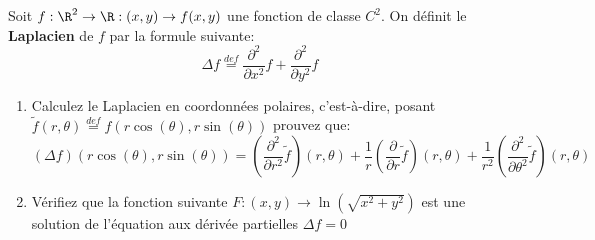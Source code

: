 
\begin{exercice}\label{exo0061}

Soit $f:\R^2 \rightarrow \R: (x, y) \rightarrow f(x,y)$ une
fonction de classe $C^2$. On définit le {\bf Laplacien} de $f$ par la
formule suivante:
\[
\Delta f \stackrel{def}= \frac{\partial ^2}{\partial x^2 } f +
\frac{\partial^2}{\partial y^2} f
\]
\begin{enumerate}
\item
Calculez le Laplacien en coordonnées polaires, c'est-\`a-dire, posant
$\tilde{f} (r, \theta) \stackrel{def}= f(r\cos(\theta),r\sin(\theta))$
prouvez que:
\[
(\Delta f)(r\cos(\theta), r\sin(\theta))
= (\frac{\partial^2}{\partial r^2}\tilde{f})(r, \theta)
+ \frac{1}{r} (\frac{\partial}{\partial r}\tilde{f})(r,\theta)
+ \frac{1}{r^2} (\frac{\partial^2}{\partial \theta^2}\tilde{f})(r,\theta)
\]
\item
Vérifiez que la fonction suivante $F:( x,y) \rightarrow \ln(\sqrt{x^2+y^2})
$ est une solution de l'équation aux dérivée partielles $\Delta f =0$
\end{enumerate}
 
\end{exercice}
